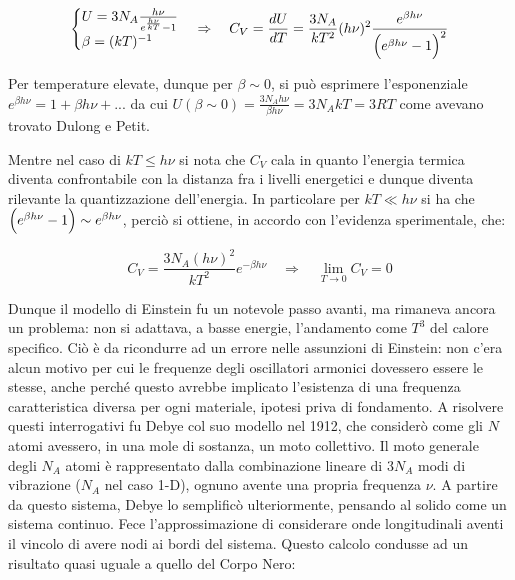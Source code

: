 \begin{equation}
\begin{cases}
	U = 3 N_A \frac{ h \nu}{e^{ \frac{ h \nu}{ k T} } - 1 } \\
	\beta = (k T)^{ -1 }
\end{cases}
\Rightarrow \quad C_V = \frac{ dU}{dT } = \frac{ 3 N_A}{k T^2 } (h \nu)^2 \frac{ e^{ \beta h \nu }}{\Bigl(  e^{ \beta h \nu } - 1   \Bigr)^2}
\end{equation}

Per temperature elevate, dunque per $\beta \sim 0$, si può esprimere l'esponenziale $e^{ \beta h \nu } = 1 + \beta h \nu + ...$
da cui $U(\beta \sim 0) = \frac{ 3 N_A h \nu}{\beta h \nu } = 3 N_A k T = 3 R T$ come avevano trovato Dulong e Petit.

Mentre nel caso di $k T \leq h \nu$ si nota che $C_V$ cala in quanto l'energia termica diventa confrontabile con la distanza fra i livelli energetici e dunque diventa rilevante la quantizzazione dell'energia.
In particolare per $k T \ll h \nu$ si ha che $\Bigl(  e^{ \beta h \nu } - 1  \Bigr) \sim e^{ \beta h \nu }$, perciò si ottiene, in accordo con l'evidenza sperimentale, che:

\begin{equation}
C_V = \frac{ 3 N_A (h \nu)^2}{k T^2 }e^{ - \beta h \nu } \quad \Rightarrow \quad \lim_{T \to 0} C_V = 0
\end{equation}

Dunque il modello di Einstein fu un notevole passo avanti, ma rimaneva ancora un problema: non si adattava, a basse energie, l'andamento come $T^3$ del calore specifico.
Ciò è da ricondurre ad un errore nelle assunzioni di Einstein: non c'era alcun motivo per cui le frequenze degli oscillatori armonici dovessero essere le stesse, anche perché questo avrebbe implicato l'esistenza di una frequenza caratteristica diversa per ogni materiale, ipotesi priva di fondamento.
A risolvere questi interrogativi fu Debye col suo modello nel 1912, che considerò come gli $N$ atomi avessero, in una mole di sostanza, un moto collettivo.
Il moto generale degli $N_A$ atomi è rappresentato dalla combinazione lineare di $3N_A$ modi di vibrazione ($N_A$ nel caso 1-D), ognuno avente una propria frequenza $\nu$.
A partire da questo sistema, Debye lo semplificò ulteriormente, pensando al solido come un sistema continuo.
Fece l'approssimazione di considerare onde longitudinali aventi il vincolo di avere nodi ai bordi del sistema.
Questo calcolo condusse ad un risultato quasi uguale a quello del Corpo Nero:

